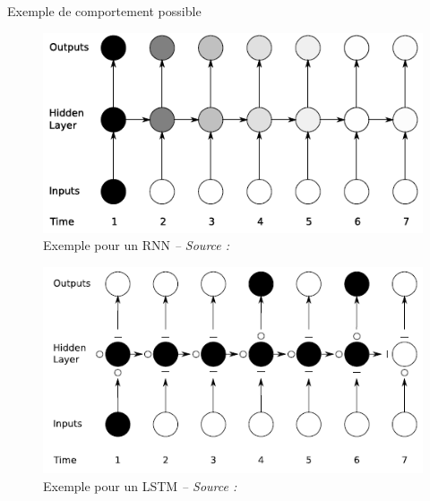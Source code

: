 \begin{frame}{Exemple de comportement possible}
    
    \begin{figure}
        \includegraphics[height=.35\textheight]{images/res_rnn}
        \vspace{-.4cm}
        \caption{Exemple pour un RNN {\scriptsize\it -- Source : \cite{Graves12}}}
    \end{figure}
    
    \vspace{-.5cm}
    
    \begin{figure}
        \includegraphics[height=.35\textheight]{images/res_lstm}
        \vspace{-.4cm}
        \caption{Exemple pour un LSTM {\scriptsize\it -- Source : \cite{Graves12}}}
    \end{figure}
    
\end{frame}



